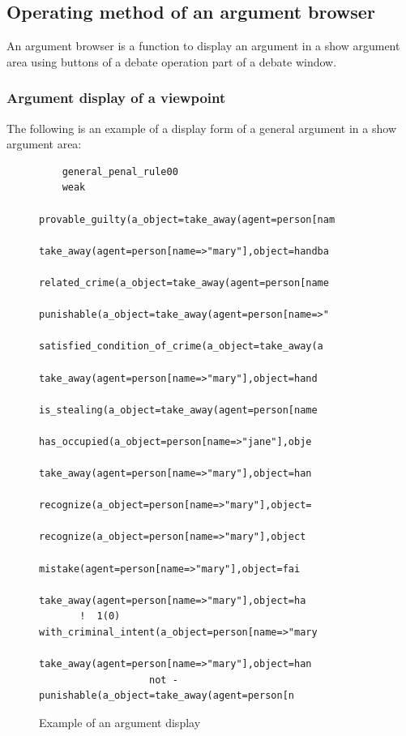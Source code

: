 \subsection{Operating method of an argument browser}\label{Operating method of an argument browser}

An argument browser is a function to display an argument in a show argument area using buttons of a debate operation part of a debate window.

\subsubsection{Argument display of a viewpoint}\label{Argument display of a viewpoint}

The following is an example of a display form of a general argument in a show argument area:
\begin{figure}[htb]
\begin{verbatim}
	general_penal_rule00
	weak
	             provable_guilty(a_object=take_away(agent=person[nam
	              take_away(agent=person[name=>"mary"],object=handba
	              related_crime(a_object=take_away(agent=person[name
	              punishable(a_object=take_away(agent=person[name=>"
	               satisfied_condition_of_crime(a_object=take_away(a
	                take_away(agent=person[name=>"mary"],object=hand
	                is_stealing(a_object=take_away(agent=person[name
	                 has_occupied(a_object=person[name=>"jane"],obje
	                 take_away(agent=person[name=>"mary"],object=han
	                 recognize(a_object=person[name=>"mary"],object=
	                  recognize(a_object=person[name=>"mary"],object
	                   mistake(agent=person[name=>"mary"],object=fai
	                  take_away(agent=person[name=>"mary"],object=ha
	   !  1(0)      with_criminal_intent(a_object=person[name=>"mary
	                 take_away(agent=person[name=>"mary"],object=han
	               not -punishable(a_object=take_away(agent=person[n
\end{verbatim}
\caption{Example of an argument display}\label{Example of an argument display}
\end{figure}

